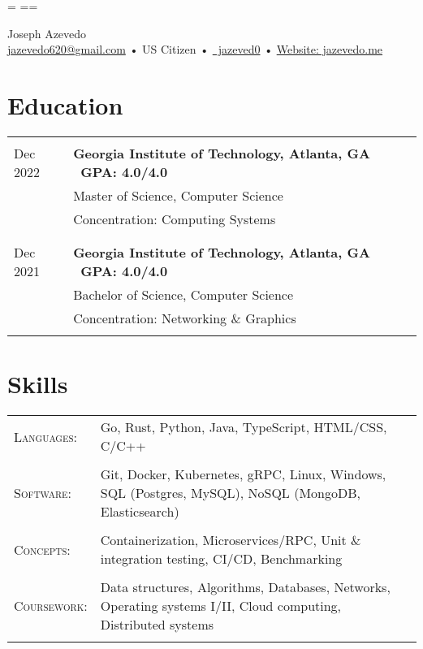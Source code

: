 \documentclass[a4paper,11pt]{article}
\newenvironment{rsection}[1]
  {
    \section{#1}
    \begin{tabular}{>{\raggedleft\arraybackslash}p{\lcolwidth}|p{\rcolwidth}}
   } {
    \\\multicolumn{2}{c}{} \\[-10pt]
    \end{tabular}
  }
\newcommand{\rheader}[2]{
    \multirow[t]{2}{*}{
        \begin{minipage}[t]{\dimexpr \lcolwidth - 0.1cm}
            \begin{flushright}
                \textsc{#1}
            \end{flushright}
        \end{minipage}
    } & \textbf{#2}
}
\newcommand{\rline}[1]{\\& #1}
\newcommand{\ritem}[2][ •\hspace{3pt}]{\\[-2pt]& \footnotesize{#1#2}}
\newenvironment{rskills}[1][Skills]
  {
    \section{#1}
    \begin{tabular}{>{\raggedleft\arraybackslash}p{\lcolwidth}p{\rcolwidth}}
    } {
    \end{tabular}
  }
\newcommand{\rskill}[2]{\textsc{#1}:& \small #2 \\ & \\[-14pt]}
\newcommand{\rskip}{\\\multicolumn{2}{c}{} \\[\subsectionvspace]}
\newcommand{\rdot}{\xspace\hspace{0pt}•\hspace{3pt}\xspace}
\begin{document}
\hsize=\hlinewidth \vsize=11in
\hoffset=\pagehoffset \voffset=\pagevoffset
\pdfpagewidth=8.5in
\pdfpageheight=11in
\pagestyle{empty}

\newcommand{\at}{@}
\newcommand{\gmaildotcom}{gmail.com}

\newcommand{\phoneandrdot}{\xspace}

\begin{center}
     \Huge       Joseph Azevedo
  \\[2pt] \normalsize \href{mailto:jazevedo620\at\gmaildotcom}{jazevedo620\at\gmaildotcom}
    \rdot US Citizen \rdot \phoneandrdot
\href{https://github.com/jazeved0}{\faGithub\ jazeved0} \rdot
    \href{https://jazevedo.me}{Website: jazevedo.me} \\[6pt]
\end{center}
\vspace{\dimexpr \sectionvspace + 15pt}


\begin{rsection}{Education}
  \rheader{Jan 2022 -\\[-1pt] Dec 2022}{Georgia Institute of Technology,
    {\normalfont Atlanta, GA \hfill\  GPA: 4.0/4.0\ }}
  \rline{Master of Science, Computer Science}
  \vspace{2pt}
  \ritem[]{Concentration: Computing Systems}
  \rskip
  \rheader{Jun 2018 -\\[-1pt] Dec 2021}{Georgia Institute of Technology,
    {\normalfont Atlanta, GA \hfill\  GPA: 4.0/4.0\ }}
  \rline{Bachelor of Science, Computer Science}
  \vspace{2pt}
  \ritem[]{Concentration: Networking \& Graphics}
\end{rsection}
\vspace{\sectionvspace}


\begin{rskills}
  \rskill{Languages}  {Go, Rust, Python, Java, TypeScript, HTML/CSS, C/C++}
  \rskill{Software}   {Git, Docker, Kubernetes, gRPC, Linux, Windows, SQL (Postgres, MySQL),
                      NoSQL (MongoDB, Elasticsearch)}
  \rskill{Concepts}   {Containerization, Microservices/RPC,
                      Unit \& integration testing, CI/CD, Benchmarking}
  \rskill{Coursework} {Data structures, Algorithms, Databases, Networks,
                      Operating systems I/II, Cloud computing, Distributed systems}
\end{rskills}
\vspace{\dimexpr \sectionvspace + 11pt}
\end{document}
